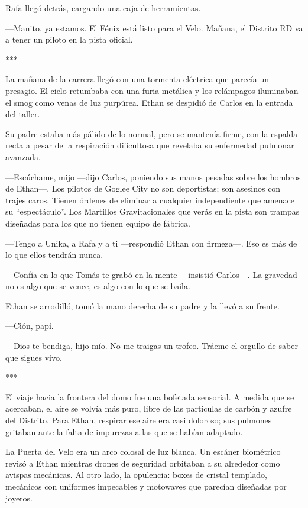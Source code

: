 \documentclass[11pt,twoside]{book}
\begin{document}
Rafa llegó detrás, cargando una caja de herramientas.

---Manito, ya estamos. El Fénix está listo para el Velo. Mañana, el Distrito RD va a tener un piloto en la pista oficial.

\bigskip
\begin{center}***\end{center}
\bigskip

La mañana de la carrera llegó con una tormenta eléctrica que parecía un presagio. El cielo retumbaba con una furia metálica y los relámpagos iluminaban el smog como venas de luz purpúrea. Ethan se despidió de Carlos en la entrada del taller. 

Su padre estaba más pálido de lo normal, pero se mantenía firme, con la espalda recta a pesar de la respiración dificultosa que revelaba su enfermedad pulmonar avanzada.

---Escúchame, mijo ---dijo Carlos, poniendo sus manos pesadas sobre los hombros de Ethan---. Los pilotos de Goglee City no son deportistas; son asesinos con trajes caros. Tienen órdenes de eliminar a cualquier independiente que amenace su ``espectáculo''. Los Martillos Gravitacionales que verás en la pista son trampas diseñadas para los que no tienen equipo de fábrica.

---Tengo a Unika, a Rafa y a ti ---respondió Ethan con firmeza---. Eso es más de lo que ellos tendrán nunca.

---Confía en lo que Tomás te grabó en la mente ---insistió Carlos---. La gravedad no es algo que se vence, es algo con lo que se baila.

Ethan se arrodilló, tomó la mano derecha de su padre y la llevó a su frente.

---Ción, papi.

---Dios te bendiga, hijo mío. No me traigas un trofeo. Tráeme el orgullo de saber que sigues vivo.

\bigskip
\begin{center}***\end{center}
\bigskip

El viaje hacia la frontera del domo fue una bofetada sensorial. A medida que se acercaban, el aire se volvía más puro, libre de las partículas de carbón y azufre del Distrito. Para Ethan, respirar ese aire era casi doloroso; sus pulmones gritaban ante la falta de impurezas a las que se habían adaptado.

La Puerta del Velo era un arco colosal de luz blanca. Un escáner biométrico revisó a Ethan mientras drones de seguridad orbitaban a su alrededor como avispas mecánicas. Al otro lado, la opulencia: boxes de cristal templado, mecánicos con uniformes impecables y motowaves que parecían diseñadas por joyeros.
\end{document}
